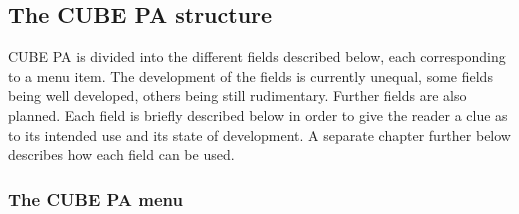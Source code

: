 \subsection{The CUBE PA structure} %

CUBE PA is divided into the different fields described below, each corresponding to a menu item. The development of the fields is currently unequal, some fields being well developed, others being still rudimentary. Further fields are also planned. Each field is briefly described below in order to give the reader a clue as to its intended use and its state of development. A separate chapter further below describes how each field can be used.

\pagebreak
\subsubsection{The CUBE PA menu} %

\setlength{\abovecaptionskip}{0pt}

